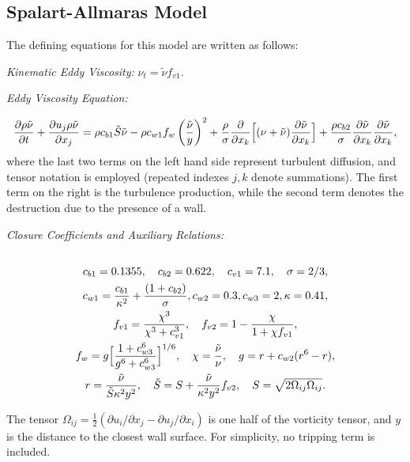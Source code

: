 \subsection{Spalart-Allmaras Model}
The defining equations for this model are written as follows:

\vspace{0.2cm}
{\it Kinematic Eddy Viscosity:} $\nu_t = \tilde{\nu} f_{v1}$.

{\it Eddy Viscosity Equation:}

\begin{equation}
\frac{\partial \rho \tilde{\nu}}{\partial t}+\frac{\partial{u_j \rho \tilde{\nu}}}
{\partial x_j} =
 \rho c_{b1}\Tilde{S}\tilde{\nu} 
- \rho c_{w1} f_w \left ( \frac{\tilde{\nu}}{y} \right )^2 +
\frac{\rho}{\sigma}\frac{\partial}{\partial x_k} \Bigl[ (\nu+\tilde{\nu}) \frac
{\partial\tilde{\nu}}{\partial x_k} \Bigr ] + \frac{\rho c_{b2}}{\sigma}
\frac{\partial 
\tilde{\nu}}{\partial x_k}\frac{\partial \tilde{\nu}}{\partial x_k},
\label{Spalart-Allmaras}
\end{equation}
where the last two terms on the left hand side represent turbulent
diffusion, and tensor notation is employed (repeated indexes $j,k$
denote summations). The first term on the right is the turbulence
production, while the second term denotes the destruction due to the
presence of a wall.

{\it Closure Coefficients and Auxiliary Relations:}
\begin{multline*}
\\
c_{b1}=0.1355, \quad c_{b2}=0.622, \quad c_{v1}=7.1, \quad \sigma =2/3, \\
c_{w1}=\frac{c_{b1}}{\kappa ^{2}}+\frac{(1+c_{b2})}{\sigma},  c_{w2}=0.3,
c_{w3}=2,  \kappa=0.41, \\
f_{v1}=\frac{\chi^{3}}{\chi^{3}+c_{v1}^{3}},\quad f_{v2}=1-\frac{\chi}
{1+\chi f_{v1}}, \\
f_w=g \Bigl [ \frac{1+c_{w3}^{6}}{g^6+c_{w3}^{6}}\Bigr]^{1/6}, \quad 
\chi=\frac{\tilde{\nu}}{\nu}, \quad g=r+c_{w2}(r^{6}-r), \\
r=\frac{\tilde{\nu}}{\Tilde{S}\kappa^{2}y^{2}},\quad 
\Tilde S=S+\frac{\tilde{\nu}}{\kappa^{2}y^{2}}f_{v2}, \quad
S=\sqrt{2\Omega_{ij}\Omega_{ij}}.\\
 \label{aux01}
\end{multline*}

The tensor $\Omega_{ij}=\frac{1}{2}(\partial u_i/\partial x_j-
\partial u_j/\partial x_i)$ is one half of the vorticity tensor, and
$y$ is the distance to the closest wall surface. For simplicity, no
tripping term is included.

